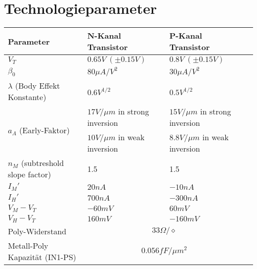 \appendix

\section{Technologieparameter}

\begin{tabularx}{\linewidth}{|X|l|ll|}
	\hline
		\textbf{Parameter} & \textbf{N-Kanal Transistor} & \textbf{P-Kanal Transistor} &
	\\ \hline
		$V_T$ & $0.65V \: (\pm 0.15V)$ & $0.8V \: (\pm 0.15V)$ &
	\\ \hline
		$\beta_0$ & $80 \mu A / V^2$ & $30 \mu A / V^2$ &
	\\ \hline
		$\lambda$ (Body Effekt Konstante) & $0.6V^{1/2}$ & $0.5 V^{1/2}$ & 
	\\ \hline
		\multirow{2}{*}{$a_A$ (Early-Faktor)} & $17V/\mu m$ in strong inversion & $15V/\mu m$ in strong inversion &
	\\
		& $10V/\mu m$ in weak inversion & $8.8V/\mu m$ in weak inversion &
	\\ \hline
		$n_M$ (subtreshold slope factor) & 1.5 & 1.5 &
	\\ \hline
		$I_M'$ & $20nA$ & $-10nA$ &
	\\ \hline
		$I_H'$ & $700nA$ & $-300nA$ &
	\\ \hline
		$V_M-V_T$ & $-60mV$ & $60mV$ &
	\\ \hline
		$V_H-V_T$ & $160mV$ & $-160mV$ &
	\\ \hline
		Poly-Widerstand & \multicolumn{2}{c}{$33 \Omega / \diamond$} &
	\\ \hline
		Metall-Poly Kapazität (IN1-PS) & \multicolumn{2}{c}{$0.056 fF / \mu m^2$} &
	\\ \hline
\end{tabularx}